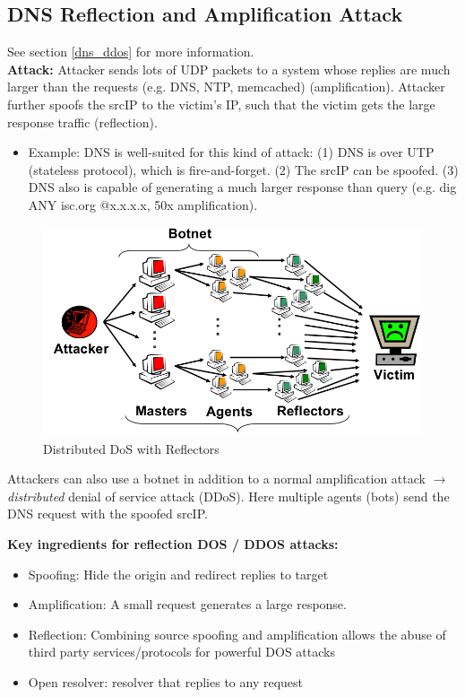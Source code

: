 \documentclass[11pt,oneside,a4paper]{article}
\begin{document}
\subsection{DNS Reflection and Amplification Attack}

See section \ref{dns_ddos} for more information.\\

\noindent \textbf{Attack:} Attacker sends lots of UDP packets to a system whose replies are much larger than the requests (e.g. DNS, NTP, memcached) (amplification). Attacker further spoofs the srcIP to the victim's IP, such that the victim gets the large response traffic (reflection).

\vspace{-\topsep}
\begin{itemize}
	\setlength{\itemsep}{0pt}
	\setlength{\parskip}{0pt}
	\item Example: DNS is well-suited for this kind of attack: (1) DNS is over UTP (stateless protocol), which is fire-and-forget. (2) The srcIP can be spoofed. (3) DNS also is capable of generating a much larger response than query (e.g. dig ANY isc.org @x.x.x.x, 50x amplification).
\end{itemize}
\vspace{-\topsep}

\begin{figure}
	\centering
	\includegraphics[width=0.4\linewidth]{figures/ddos_with_reflectors}
	\caption{Distributed DoS with Reflectors}
	\label{fig:ddoswithreflectors}
\end{figure}

\noindent Attackers can also use a botnet in addition to a normal amplification attack $\rightarrow$ \textit{distributed} denial of service attack (DDoS). Here multiple agents (bots) send the DNS request with the spoofed srcIP.

\newpage

\noindent\textbf{Key ingredients for reflection DOS / DDOS attacks:}

\vspace{-\topsep}
\begin{itemize}
	\setlength{\itemsep}{0pt}
	\setlength{\parskip}{0pt}
	\item Spoofing: Hide the origin and redirect replies to target
	\item Amplification: A small request generates a large response.
	\item Reflection: Combining source spoofing and amplification allows the 	abuse of third party services/protocols for powerful DOS attacks
	\item Open resolver: resolver that replies to any request
\end{itemize}
\vspace{-\topsep}
\end{document}
